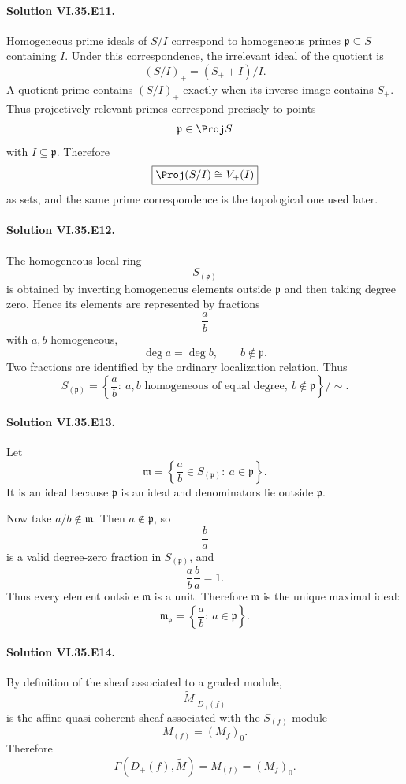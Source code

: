 \paragraph{Solution VI.35.E11.}
Homogeneous prime ideals of \(S/I\) correspond to homogeneous primes \(\mathfrak p\subseteq S\) containing \(I\).
Under this correspondence, the irrelevant ideal of the quotient is
\[
(S/I)_+=(S_++I)/I.
\]
A quotient prime contains \((S/I)_+\) exactly when its inverse image contains \(S_+\). Thus projectively relevant
primes correspond precisely to points
\[
\mathfrak p\in\Proj S
\]
with \(I\subseteq\mathfrak p\). Therefore
\[
\boxed{\Proj(S/I)\cong V_+(I)}
\]
as sets, and the same prime correspondence is the topological one used later.

\paragraph{Solution VI.35.E12.}
The homogeneous local ring
\[
S_{(\mathfrak p)}
\]
is obtained by inverting homogeneous elements outside \(\mathfrak p\) and then taking degree zero. Hence its
elements are represented by fractions
\[
\frac ab
\]
with \(a,b\) homogeneous,
\[
\deg a=\deg b,
\qquad
b\notin\mathfrak p.
\]
Two fractions are identified by the ordinary localization relation. Thus
\[
\boxed{
S_{(\mathfrak p)}
=
\left\{\frac ab:\ a,b\text{ homogeneous of equal degree},\ b\notin\mathfrak p\right\}/\sim.
}
\]

\paragraph{Solution VI.35.E13.}
Let
\[
\mathfrak m
=
\left\{\frac ab\in S_{(\mathfrak p)}:\ a\in\mathfrak p\right\}.
\]
It is an ideal because \(\mathfrak p\) is an ideal and denominators lie outside \(\mathfrak p\).

Now take \(a/b\notin\mathfrak m\). Then \(a\notin\mathfrak p\), so
\[
\frac ba
\]
is a valid degree-zero fraction in \(S_{(\mathfrak p)}\), and
\[
\frac ab\frac ba=1.
\]
Thus every element outside \(\mathfrak m\) is a unit. Therefore \(\mathfrak m\) is the unique maximal ideal:
\[
\boxed{
\mathfrak m_{\mathfrak p}
=
\left\{\frac ab:\ a\in\mathfrak p\right\}.
}
\]

\paragraph{Solution VI.35.E14.}
By definition of the sheaf associated to a graded module,
\[
\widetilde M|_{D_+(f)}
\]
is the affine quasi-coherent sheaf associated with the \(S_{(f)}\)-module
\[
M_{(f)}=(M_f)_0.
\]
Therefore
\[
\boxed{\Gamma(D_+(f),\widetilde M)=M_{(f)}=(M_f)_0}.
\]

